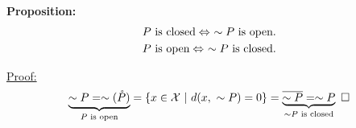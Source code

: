 \documentclass[letterpaper]{article}
\begin{document}
\noindent \textbf{Proposition:}
    \begin{align*}
        &P\textnormal{ is closed}\Leftrightarrow\ \sim P\textnormal{ is open}.\\
        &P\textnormal{ is open}\Leftrightarrow\ \sim P\textnormal{ is closed}.
    \end{align*}

\noindent \underline{Proof:}
\begin{equation*}
    \underbrace{\sim P=\sim(\mathring{P})}_{P\textnormal{ is open}}=\{x\in\mathcal{X}\ |\ d(x,\ \sim P)=0\}=\underbrace{\overline{\sim P}=\sim P}_{\sim P\textnormal{ is closed}}\ \square
\end{equation*}
\end{document}
